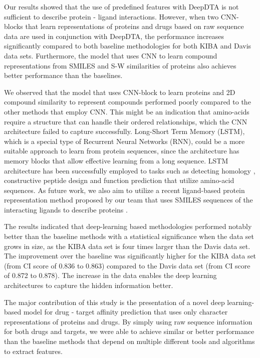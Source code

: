 \documentclass[11pt,letterpaper]{article}
\begin{document}
Our results showed that the use of predefined features with DeepDTA is not sufficient to describe protein - ligand interactions. However, when two CNN-blocks that learn representations of proteins and drugs based on raw sequence data are used in conjunction  with DeepDTA, the performance increases  significantly compared to both baseline methodologies for both KIBA and Davis data sets. Furthermore, the model that uses CNN to learn compound representations from SMILES and S-W similarities of proteins also achieves better performance than the baselines. 


We  observed that the model that uses CNN-block to learn proteins and 2D compound similarity to represent compounds performed poorly compared to the other methods that employ CNN.  This might be an indication that amino-acids  require a structure that can handle their ordered relationships, which the CNN architecture failed to capture successfully. Long-Short Term Memory (LSTM), which is a special type of Recurrent Neural Networks (RNN), could be a more suitable approach to learn from protein sequences, since the architecture has memory blocks that allow effective learning from a long sequence. LSTM architecture has been successfully employed to tasks such as  detecting homology \cite{hochreiter2007fast}, constructive peptide design \cite{muller2018recurrent}  and function prediction \cite{liu2017deep} that utilize amino-acid sequences. As future work, we also aim to utilize a recent ligand-based protein representation method proposed by our team that uses SMILES sequences of the interacting ligands to describe proteins \cite{ozturk2018novel} .

The results indicated that deep-learning based methodologies performed notably better than the baseline methods with a statistical significance when the data set grows in size, as the KIBA data set is four times larger than the Davis data set. The improvement over the baseline was significantly higher for the KIBA data set (from CI score of 0.836 to 0.863) compared to the Davis data set (from CI score of 0.872 to 0.878). The increase in the data enables the deep learning architectures to capture the hidden information better. 

The major contribution of this study is the presentation of a novel deep learning-based model for drug - target affinity prediction that  uses only character representations of  proteins and drugs. By simply using raw sequence information for both drugs and targets, we were able to achieve similar or better performance than the baseline methods that depend on  multiple different tools and algorithms to extract features.   
\end{document}
